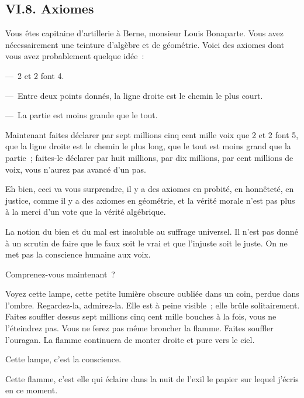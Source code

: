 \documentclass[french,twoside]{book} %
\begin{document}
\subsection[{VI.8. Axiomes}]{VI.8. Axiomes}
\noindent Vous êtes capitaine d’artillerie à Berne, monsieur Louis Bonaparte. Vous avez nécessairement une teinture d’algèbre et de géométrie. Voici des axiomes dont vous avez probablement quelque idée :\par
— 2 et 2 font 4.\par
— Entre deux points donnés, la ligne droite est le chemin le plus court.\par
— La partie est moins grande que le tout.\par
Maintenant faites déclarer par sept millions cinq cent mille voix que 2 et 2 font 5, que la ligne droite est le chemin le plus long, que le tout est moins grand que la partie ; faites-le déclarer par huit millions, par dix millions, par cent millions de voix, vous n’aurez pas avancé d’un pas.\par
Eh bien, ceci va vous surprendre, il y a des axiomes en probité, en honnêteté, en justice, comme il y a des axiomes en géométrie, et la vérité morale n’est pas plus à la merci d’un vote que la vérité algébrique.\par
La notion du bien et du mal est insoluble au suffrage universel. Il n’est pas donné à un scrutin de faire que le faux soit le vrai et que l’injuste soit le juste. On ne met pas la conscience humaine aux voix.\par
Comprenez-vous maintenant ?\par
Voyez cette lampe, cette petite lumière obscure oubliée dans un coin, perdue dans l’ombre. Regardez-la, admirez-la. Elle est à peine visible ; elle brûle solitairement. Faites souffler dessus sept millions cinq cent mille bouches à la fois, vous ne l’éteindrez pas. Vous ne ferez pas même broncher la flamme. Faites souffler l’ouragan. La flamme continuera de monter droite et pure vers le ciel.\par
Cette lampe, c’est la conscience.\par
Cette flamme, c’est elle qui éclaire dans la nuit de l’exil le papier sur lequel j’écris en ce moment.
\end{document}
